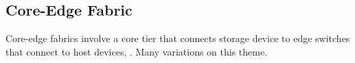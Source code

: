 \documentclass[slides]{pgnotes}
\begin{document}

\subsection{Core-Edge Fabric}
\label{sec:core-edge-fabric}

Core-edge fabrics involve a core tier that connects storage device to
edge switches that connect to host devices, . Many variations on this
theme.

\end{document}
